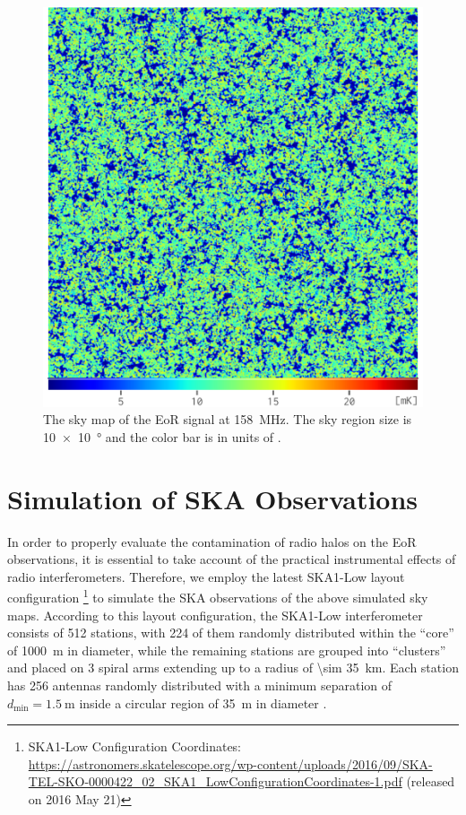 \documentclass[twocolumn]{aastex62}
\newcommand{\R}[1]{\mathrm{#1}}
\begin{document}
\begin{figure}
  \centering
  \includegraphics[width=\columnwidth]{21cm-f158}
  \caption{\label{fig:map-eor}%
    The sky map of the EoR signal at \SI{158}{\MHz}.
    The sky region size is \SI[product-units=repeat]{10 x 10}{\degree}
    and the color bar is in units of \si{\mK}.
  }
\end{figure}


\section{Simulation of SKA Observations}
\label{sec:obs-simu}

In order to properly evaluate the contamination of radio halos
on the EoR observations, it is essential to take account of the
practical instrumental effects of radio interferometers.
Therefore, we employ the latest SKA1-Low layout configuration%
\footnote{\raggedright%
  SKA1-Low Configuration Coordinates:
  \url{https://astronomers.skatelescope.org/wp-content/uploads/2016/09/SKA-TEL-SKO-0000422_02_SKA1_LowConfigurationCoordinates-1.pdf}
  (released on 2016 May 21)
}
to simulate the SKA observations of the above simulated sky maps.
According to this layout configuration,
the SKA1-Low interferometer consists of 512 stations, with 224 of them
randomly distributed within the \enquote{core} of \SI{1000}{\meter} in
diameter, while the remaining stations are grouped into \enquote{clusters}
and placed on 3 spiral arms extending up to a radius of
\SI{\sim 35}{\kilo\meter}.
Each station has 256 antennas randomly distributed with a minimum separation
of $d_{\R{min}} = \SI{1.5}{\meter}$ inside a circular region of
\SI{35}{\meter} in diameter \citep[e.g.,][]{mort2017}.
\end{document}

